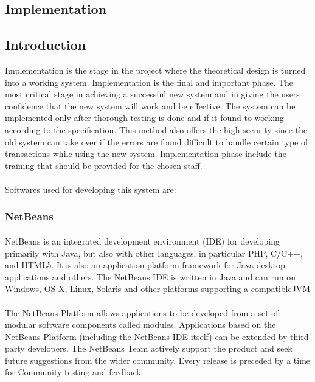\begin{center}
\section{Implementation}
\end{center}
\paragraph{}

\subsection{Introduction}
Implementation is the stage in the project where the theoretical design is turned into a working system. Implementation is the final and important phase. The most critical stage in achieving a successful new system and in giving the users confidence that the new system will work and be effective. The system can be implemented only after thorough testing is done and if it found to working according to the specification. This method also offers the high security since the old system can take over if the errors are found difficult to handle certain type of transactions while using the new system. Implementation phase include the training that should be provided for the chosen staff.
\paragraph{}
Softwares used for developing this system are:
\subsubsection{NetBeans}
\paragraph{}
NetBeans is an integrated development environment (IDE) for developing primarily with Java, but also with other languages, in particular PHP, C/C++, and HTML5. It is also an application platform framework for Java desktop applications and others.
The NetBeans IDE is written in Java and can run on Windows, OS X, Linux, Solaris and other platforms supporting a compatibleJVM
\paragraph{}
The NetBeans Platform allows applications to be developed from a set of modular software components called modules. Applications based on the NetBeans Platform (including the NetBeans IDE itself) can be extended by third party developers. 
The NetBeans Team actively support the product and seek future suggestions from the wider community. Every release is preceded by a time for Community testing and feedback.

